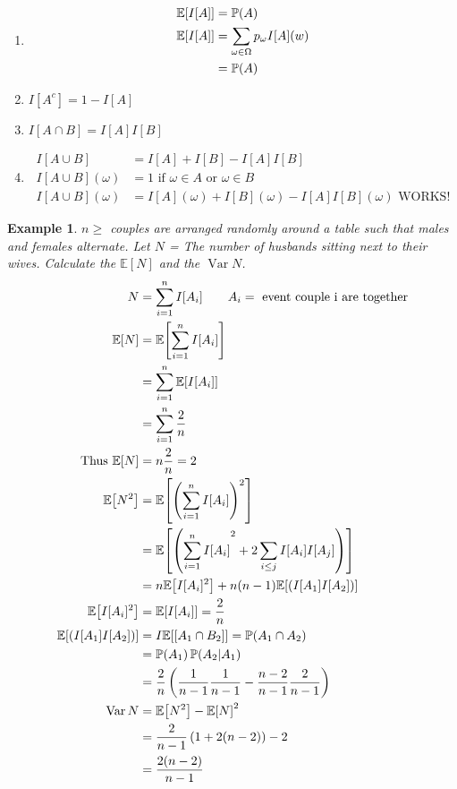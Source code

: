 \documentclass{notes}
\theoremstyle{plain}
\newtheorem*{example}{Example}
\newcommand{\bP}{\mathbb{P}}
\newcommand{\bE}{\mathbb{E}}
\newcommand{\prob}[1]{\bP \negthinspace\left(#1\right)}
\newcommand{\expect}[1]{\bE\!\left[#1\right]}
\DeclareMathOperator{\var}{Var}
\begin{document}
\begin{enumerate}
\item \begin{align*}
\expect{I[A]} &= \prob{A}\\
\expect{I[A]} &= \sum_{\omega \in \Omega} p_{\omega}I[A](w)\\
&=  \prob{A}
\end{align*}
\item $I[A^c] = 1 - I[A]$
\item $I[A \cap B] = I[A]I[B]$
\item \begin{align*}
I[A \cup B] &= I[A] + I[B] - I[A]I[B]\\
I[A \cup B](\omega) &= 1 \text{ if } \omega \in A \text{ or } \omega \in B\\
I[A \cup B](\omega) &= I[A](\omega) + I[B](\omega) - I[A]I[B](\omega) \text{ WORKS!}
\end{align*}
\end{enumerate}

\begin{example}
$n\geq$ couples are arranged randomly around a table such that males 
and females alternate.
Let $N$ = The number of husbands sitting next to their wives. 
Calculate the $\expect{N}$ and the $\var{N}$. 
\begin{align*}
N &= \sum_{i=1}^n I[A_i] \qquad A_i = \text{ event couple i are together}\\
\expect{N} &= \expect{\sum_{i=1}^nI[A_i]}\\
&= \sum_{i=1}^n \expect{I[A_i]}\\
&= \sum_{i=1}^n \frac{2}{n}\\
\text{Thus } \expect{N} &= n \frac{2}{n} = 2\\
\expect{N^2} &=  \expect{\left(\sum_{i=1}^nI[A_i]\right)^2}\\
&=\expect{\left({\sum_{i=1}^nI[A_i]}^2 + 2\sum_{i\le j}I[A_i]I[A_j]\right)}\\
&= n \expect{I[A_i]^2} + n(n-1) \expect{\left(I[A_1]I[A_2]\right)}\\
\expect{I[A_i]^2} &= \expect{I[A_i]} = \frac{2}{n}\\
 \expect{\left(I[A_1]I[A_2]\right)} &= I\expect{[A_1 \cap B_2]} 
= \prob{A_1 \cap A_2}\\
&=\prob{A_1}\prob{A_2|A_1}\\
&= \frac{2}{n}\left( \frac{1}{n-1}\frac{1}{n-1} - \frac{n-2}{n-1}\frac{2}{n-1}\right)\\
\var{N} &= \expect{N^2} - {\expect{N}}^2\\
&= \frac{2}{n-1}\left(1 + 2(n-2)\right) - 2\\
&= \frac{2(n-2)}{n-1}
\end{align*}
\end{example}
\end{document}

